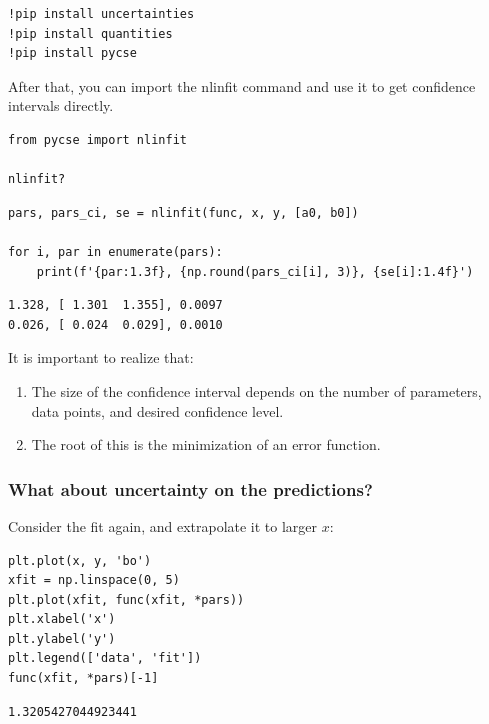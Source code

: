 \documentclass[11pt]{article}
\begin{document}
\begin{verbatim}
!pip install uncertainties
!pip install quantities
!pip install pycse
\end{verbatim}



After that, you can import the nlinfit command and use it to get confidence intervals directly.

\begin{verbatim}
from pycse import nlinfit

nlinfit?
\end{verbatim}

\begin{verbatim}
pars, pars_ci, se = nlinfit(func, x, y, [a0, b0])

for i, par in enumerate(pars):
    print(f'{par:1.3f}, {np.round(pars_ci[i], 3)}, {se[i]:1.4f}')
\end{verbatim}

\begin{verbatim}
1.328, [ 1.301  1.355], 0.0097
0.026, [ 0.024  0.029], 0.0010

\end{verbatim}

It is important to realize that:
\begin{enumerate}
\item The size of the confidence interval depends on the number of parameters, data points, and desired confidence level.
\item The root of this is the minimization of an error function.
\end{enumerate}

\subsubsection{What about uncertainty on the predictions?}
\label{sec:org7bdbeb6}

Consider the fit again, and extrapolate it to larger \(x\):

\begin{verbatim}
plt.plot(x, y, 'bo')
xfit = np.linspace(0, 5)
plt.plot(xfit, func(xfit, *pars))
plt.xlabel('x')
plt.ylabel('y')
plt.legend(['data', 'fit'])
func(xfit, *pars)[-1]
\end{verbatim}

\begin{verbatim}
1.3205427044923441
\end{verbatim}
\end{document}
